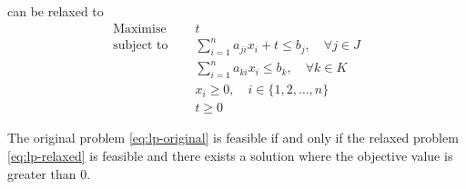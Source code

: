 \documentclass[runningheads]{llncs}
\begin{document}
can be relaxed to
\begin{equation}
    \label{eq:lp-relaxed}
    \begin{split}
        \text{Maximise }   \quad & t                                                             \\
        \text{subject to } \quad & \sum_{i=1}^{n} a_{ji}x_{i} + t \le b_j, \quad \forall j \in J \\
        \quad                    & \sum_{i=1}^{n} a_{ki}x_{i} \le b_k, \quad \forall k \in K     \\
                                 & x_i \ge 0 , \quad i \in \{1, 2, \ldots, n\}                   \\
                                 & t \ge 0
    \end{split}
\end{equation}

\begin{theorem}
    \label{thm:lp-relaxed}
    The original problem \eqref{eq:lp-original} is feasible if and only if the relaxed problem \eqref{eq:lp-relaxed} is feasible and there exists a solution where the objective value is greater than $0$.
\end{theorem}
\end{document}

